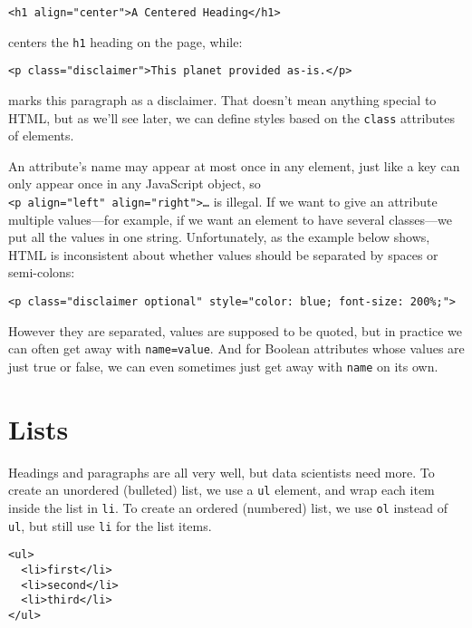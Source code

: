 \begin{verbatim}
<h1 align="center">A Centered Heading</h1>
\end{verbatim}

\noindent
centers the \texttt{h1} heading on the page, while:

\begin{verbatim}
<p class="disclaimer">This planet provided as-is.</p>
\end{verbatim}

\noindent
marks this paragraph as a disclaimer.
That doesn't mean anything special to HTML,
but as we'll see later,
we can define styles based on the \texttt{class} attributes of elements.

An attribute's name may appear at most once in any element,
just like a key can only appear once in any JavaScript object,
so \texttt{{\textless}p\ align="left"\ align="right"{\textgreater}{\ldots}} is illegal.
If we want to give an attribute multiple values---for example,
if we want an element to have several classes---we put all the values in one string.
Unfortunately,
as the example below shows,
HTML is inconsistent about whether values should be separated by spaces or semi-colons:

\begin{verbatim}
<p class="disclaimer optional" style="color: blue; font-size: 200%;">
\end{verbatim}

However they are separated,
values are supposed to be quoted,
but in practice we can often get away with \texttt{name=value}.
And for Boolean attributes whose values are just true or false,
we can even sometimes just get away with \texttt{name} on its own.

\section{Lists}\label{s:htmlcss-lists}

Headings and paragraphs are all very well,
but data scientists need more.
To create an unordered (bulleted) list,
we use a \texttt{ul} element,
and wrap each item inside the list in \texttt{li}.
To create an ordered (numbered) list,
we use \texttt{ol} instead of \texttt{ul},
but still use \texttt{li} for the list items.

\begin{verbatim}
<ul>
  <li>first</li>
  <li>second</li>
  <li>third</li>
</ul>
\end{verbatim}

